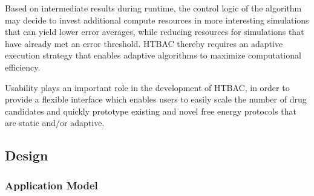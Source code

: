 


Based on intermediate results during runtime, the control logic of the
algorithm may decide to invest additional compute resources in more
interesting simulations that can yield lower error averages, while reducing
resources for simulations that have already met an error threshold.
HTBAC thereby requires an adaptive execution strategy 
 that enables 
adaptive algorithms to maximize computational efficiency. 

Usability plays an important role in the development of HTBAC, in order to
provide a flexible interface which enables users to easily scale the number
of drug candidates and quickly prototype existing and novel free energy
protocols that are static and/or adaptive. 

\subsection{Design}

\subsubsection{Application Model}

